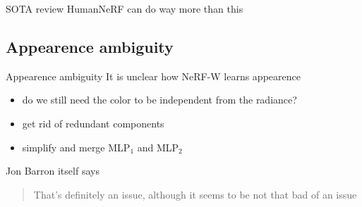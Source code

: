 \documentclass[aspectratio=1610]{beamer}
\begin{document}
\begin{frame}{SOTA review}
    HumanNeRF can do way more than this
\end{frame}

\subsection{Appearence ambiguity}
\begin{frame}{Appearence ambiguity}
    It is unclear how NeRF-W learns appearence
    \bigskip
    \begin{itemize}
        \item do we still need the color to be independent from the radiance?
        \item get rid of redundant components
        \item simplify and merge MLP\(_1\) and MLP\(_2\)
    \end{itemize}
    \bigskip
    \begin{exampleblock}{Jon Barron itself says}
        \begin{quote}
            That's definitely an issue, although it seems to be not that bad of an issue
          \end{quote}
    \end{exampleblock}
\end{frame}
\end{document}
